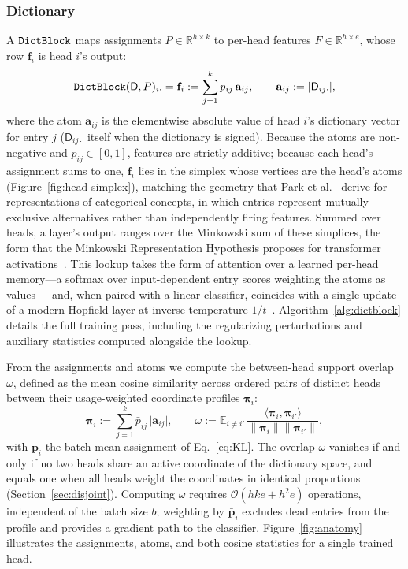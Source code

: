 \subsubsection{Dictionary}
\label{sec:dict}
A $\mathop{\mathtt{DictBlock}}\limits$ maps assignments $P \in \mathbb{R}^{h \times k}$ to
per-head features $F \in \mathbb{R}^{h \times e}$, whose row
$\mathbf{f}_i$ is head $i$'s output:
\begin{equation}
	\mathop{\mathtt{DictBlock}}\limits(\mathsf{D},P)_{i\cdot} = \mathbf{f}_i :=
	\sum^{k}_{j=1} p_{ij}\,\mathbf{a}_{ij},
	\qquad
	\mathbf{a}_{ij} := \lvert \mathsf{D}_{ij\cdot}\rvert,
	\label{eq:dictblock}
\end{equation}
where the atom $\mathbf{a}_{ij}$ is the elementwise absolute value of
head $i$'s dictionary vector for entry $j$ ($\mathsf{D}_{ij\cdot}$ itself
when the dictionary is signed). Because the atoms are non-negative and
$p_{ij} \in [0,1]$, features are strictly additive; because each head's
assignment sums to one, $\mathbf{f}_i$ lies in the simplex whose vertices
are the head's atoms (Figure~\ref{fig:head-simplex}), matching the
geometry that Park et al.~\cite{park2025} derive for representations of
categorical concepts, in which entries represent mutually exclusive
alternatives rather than independently firing features. Summed over
heads, a layer's output ranges over the Minkowski sum of these simplices,
the form that the Minkowski Representation Hypothesis proposes for
transformer activations~\cite{fel2026rabbit}. This lookup takes
the form of attention over a learned per-head memory---a softmax over
input-dependent entry scores weighting the atoms as
values~\cite{bahdanau2015,luong2015,vaswani2017}---and, when paired with
a linear classifier, coincides with a single update of a modern Hopfield
layer at inverse temperature $1/t$~\cite{ramsauer2021}.
Algorithm~\ref{alg:dictblock} details the full training pass, including
the regularizing perturbations and auxiliary statistics computed
alongside the lookup.



From the assignments and atoms we compute the between-head support
overlap $\omega$, defined as the mean cosine similarity across ordered
pairs of distinct heads between their usage-weighted coordinate profiles
$\boldsymbol{\pi}_i$:
\begin{equation}
	\boldsymbol{\pi}_i := \sum^{k}_{j=1} \bar{p}_{ij}\,
	\lvert \mathbf{a}_{ij}\rvert,
	\qquad
	\omega := \mathbb{E}_{i \neq i'}\,
	\frac{\langle \boldsymbol{\pi}_i, \boldsymbol{\pi}_{i'}\rangle}
	     {\lVert \boldsymbol{\pi}_i\rVert \lVert \boldsymbol{\pi}_{i'}\rVert},
	\label{eq:support}
\end{equation}
with $\bar{\mathbf{p}}_i$ the batch-mean assignment of
Eq.~\eqref{eq:KL}. The overlap $\omega$ vanishes if and only if no two
heads share an active coordinate of the dictionary space, and equals one
when all heads weight the coordinates in identical proportions
(Section~\ref{sec:disjoint}). Computing $\omega$ requires
$\mathcal{O}(hke + h^2e)$ operations, independent of the batch size $b$;
weighting by $\bar{\mathbf{p}}_i$ excludes dead entries from the profile
and provides a gradient path to the classifier. Figure~\ref{fig:anatomy}
illustrates the assignments, atoms, and both cosine statistics for a
single trained head.


